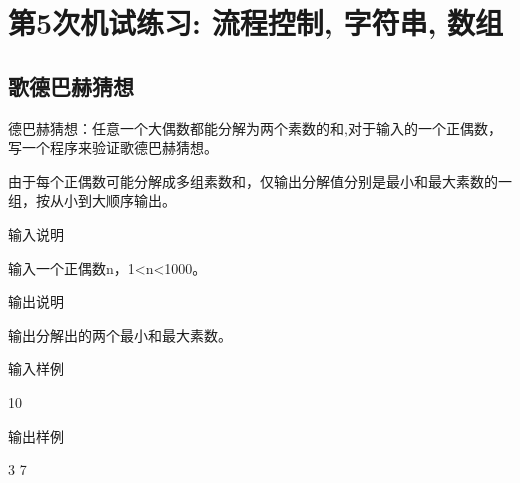 %
%
%
\chapter{第5次机试练习: 流程控制, 字符串, 数组}

\section{歌德巴赫猜想}
德巴赫猜想：任意一个大偶数都能分解为两个素数的和,对于输入的一个正偶数，写一个程序来验证歌德巴赫猜想。

由于每个正偶数可能分解成多组素数和，仅输出分解值分别是最小和最大素数的一组，按从小到大顺序输出。

输入说明	

输入一个正偶数n，1<n<1000。

输出说明
	
输出分解出的两个最小和最大素数。

输入样例
	
10

输出样例
	
3 7

